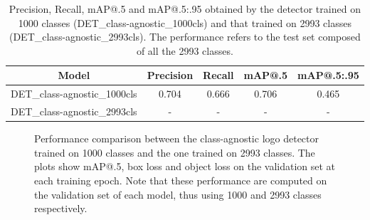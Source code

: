 \begin{table}[H]
    \centering
    \begin{tabular}{c|c|c|c|c}
        \hline
        \textbf{Model} &
        \textbf{Precision} &
        \textbf{Recall} &
        \textbf{mAP@.5} &
        \textbf{mAP@.5:.95} \\
        \hline
        \hline
DET\_class-agnostic\_1000cls&0.704&0.666&0.706&0.465\\
DET\_class-agnostic\_2993cls&-&-&-&-\\
\hline
\end{tabular}
\caption{Precision, Recall, mAP@.5 and mAP@.5:.95 obtained by the detector trained on 1000 classes (DET\_class-agnostic\_1000cls) and that trained on 2993 classes (DET\_class-agnostic\_2993cls). The performance refers to the test set composed of all the 2993 classes.}
    \label{table:exp-det_2993}
\end{table}
\newpage

\begin{figure}[H]
	\centering
    \qquad
    \qquad
    \caption{Performance comparison between the class-agnostic logo detector trained on 1000 classes and the one trained on 2993 classes. The plots show mAP@.5, box loss and object loss on the validation set at each training epoch. Note that these performance are computed on the validation set of each model, thus using 1000 and 2993 classes respectively.}%
	\label{fig:exp-det_2993}
\end{figure}


